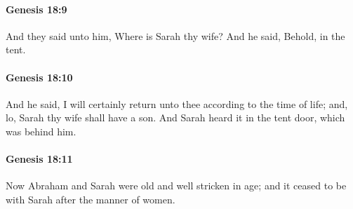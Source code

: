 		\paragraph{Genesis 18:9} %
			\label{GENESIS-18-9}

			And they said unto him, Where is Sarah thy wife?  And he said, Behold, in the tent.


		\paragraph{Genesis 18:10} %
			\label{GENESIS-18-10}

			And he said, I will certainly return unto thee according to the time of life; and, lo, Sarah thy wife shall have a son.  And Sarah heard it in the tent door, which was behind him.


		\paragraph{Genesis 18:11} %
			\label{GENESIS-18-11}

			Now Abraham and Sarah were old and well stricken in age; and it ceased to be with Sarah after the manner of women.


